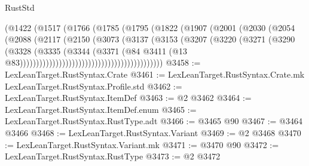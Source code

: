 \begin{lexlean}{RustStd}
\begin{coremodule}
                                        (@1422
                                          (@1517
                                            (@1766
                                              (@1785
                                                (@1795
                                                  (@1822
                                                    (@1907
                                                      (@2001
                                                        (@2030
                                                          (@2054
                                                            (@2088
                                                              (@2117
                                                                (@2150
                                                                  (@3073
                                                                    (@3137
                                                                      (@3153
                                                                        (@3207
                                                                          (@3220
                                                                            (@3271
                                                                              (@3290
                                                                                (@3328
                                                                                  (@3335
                                                                                    (@3344
                                                                                      (@3371
                                                                                        (@84
                                                                                          @3411
                                                                                          (@13
                                                                                            @83))))))))))))))))))))))))))))))))))))))))))))
@3458 := LexLeanTarget.RustSyntax.Crate
@3461 := LexLeanTarget.RustSyntax.Crate.mk LexLeanTarget.RustSyntax.Profile.std
@3462 := LexLeanTarget.RustSyntax.ItemDef
@3463 := @2 @3462
@3464 := LexLeanTarget.RustSyntax.ItemDef.enum
@3465 := LexLeanTarget.RustSyntax.RustType.adt
@3466 := @3465 @90
@3467 := @3464 @3466
@3468 := LexLeanTarget.RustSyntax.Variant
@3469 := @2 @3468
@3470 := LexLeanTarget.RustSyntax.Variant.mk
@3471 := @3470 @90
@3472 := LexLeanTarget.RustSyntax.RustType
@3473 := @2 @3472

\end{coremodule}
\end{lexlean}
